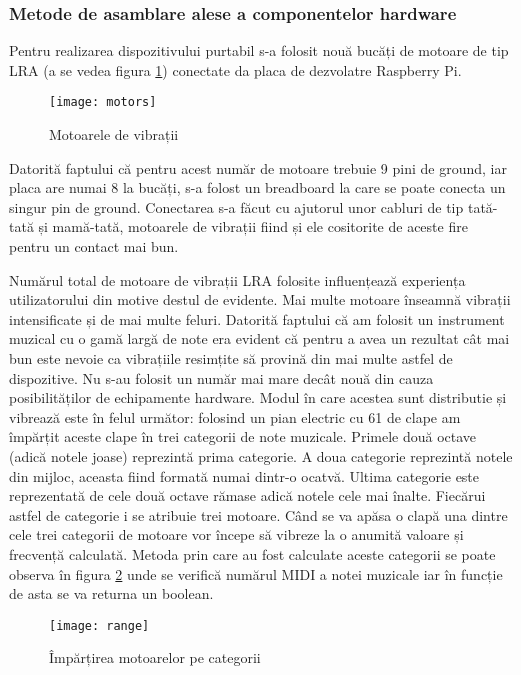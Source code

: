 \documentclass[../IoMusT.tex]{subfiles}
\begin{document}
\subsubsection{Metode de asamblare alese a componentelor hardware}
Pentru realizarea dispozitivului purtabil s-a folosit nouă bucăți de motoare de tip LRA (a se vedea figura \ref{fig:motors}) conectate da placa de dezvolatre Raspberry Pi.
\begin{figure}[h]
\centering
\texttt{[image: motors]}
\caption{Motoarele de vibrații}
\label{fig:motors}
\end{figure}  
 Datorită faptului că pentru acest număr de motoare trebuie 9 pini de ground, iar placa are numai 8 la bucăți, s-a folost un breadboard  la care se poate conecta un singur pin de ground. Conectarea s-a făcut cu ajutorul unor cabluri de tip tată-tată și mamă-tată, motoarele de vibrații fiind și ele cositorite de aceste fire pentru un contact mai bun.
\\
\par Numărul total de motoare de vibrații LRA folosite influențează experiența utilizatorului din motive destul de evidente. Mai multe motoare înseamnă vibrații intensificate și de mai multe feluri. Datorită faptului că am folosit un instrument muzical cu o gamă largă de note era evident că pentru a avea un rezultat cât mai bun este nevoie ca vibrațiile resimțite să provină din mai multe astfel de dispozitive. Nu s-au folosit un număr mai mare decât nouă din cauza posibilităților de echipamente hardware. Modul în care acestea sunt distributie și vibrează este în felul următor: folosind un pian electric cu 61 de clape am împărțit aceste clape în trei categorii de note muzicale. Primele două octave (adică notele joase) reprezintă prima categorie. A doua categorie reprezintă notele din mijloc, aceasta fiind formată numai dintr-o ocatvă. Ultima categorie este reprezentată de cele două octave rămase adică notele cele mai înalte. Fiecărui astfel de categorie i se atribuie trei motoare. Când se va apăsa o clapă una dintre cele trei categorii de motoare vor începe să vibreze la o anumită valoare și frecvență calculată. Metoda prin care au fost calculate aceste categorii se poate observa în figura \ref{fig:range} unde se verifică numărul MIDI a notei muzicale iar în funcție de asta se va returna un boolean.
\begin{figure}[h]
\centering
\texttt{[image: range]}
\caption{Împărțirea motoarelor pe categorii}
\label{fig:range}
\end{figure}  
\end{document}
